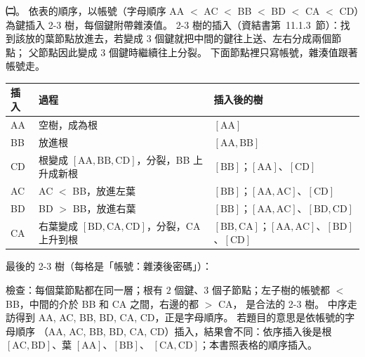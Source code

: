 \begin{pastsoln}
\textbf{㈡}。 依表的順序，以帳號（字母順序 AA $<$ AC $<$ BB $<$ BD $<$ CA $<$ CD）為鍵插入 2-3 樹，每個鍵附帶雜湊值。
2-3 樹的插入（資結書第~11.1.3~節）：找到該放的葉節點放進去，若變成 $3$ 個鍵就把中間的鍵往上送、左右分成兩個節點；
父節點因此變成 $3$ 個鍵時繼續往上分裂。 下面節點裡只寫帳號，雜湊值跟著帳號走。
\begin{center}
\small
\begin{tabular}{lll}
\toprule
插入 & 過程 & 插入後的樹 \\
\midrule
AA & 空樹，成為根 & $[\mathrm{AA}]$ \\
BB & 放進根 & $[\mathrm{AA}, \mathrm{BB}]$ \\
CD & 根變成 $[\mathrm{AA}, \mathrm{BB}, \mathrm{CD}]$，分裂，BB 上升成新根 & $[\mathrm{BB}]$；$[\mathrm{AA}]$、$[\mathrm{CD}]$ \\
AC & AC $<$ BB，放進左葉 & $[\mathrm{BB}]$；$[\mathrm{AA}, \mathrm{AC}]$、$[\mathrm{CD}]$ \\
BD & BD $>$ BB，放進右葉 & $[\mathrm{BB}]$；$[\mathrm{AA}, \mathrm{AC}]$、$[\mathrm{BD}, \mathrm{CD}]$ \\
CA & 右葉變成 $[\mathrm{BD}, \mathrm{CA}, \mathrm{CD}]$，分裂，CA 上升到根 & $[\mathrm{BB}, \mathrm{CA}]$；$[\mathrm{AA}, \mathrm{AC}]$、$[\mathrm{BD}]$、$[\mathrm{CD}]$ \\
\bottomrule
\end{tabular}
\end{center}
最後的 2-3 樹（每格是「帳號：雜湊後密碼」）：
\begin{center}
\end{center}
檢查：每個葉節點都在同一層；根有 $2$ 個鍵、$3$ 個子節點；左子樹的帳號都 $<$ BB，中間的介於 BB 和 CA 之間，右邊的都 $>$ CA，
是合法的 2-3 樹。 中序走訪得到 AA, AC, BB, BD, CA, CD，正是字母順序。 若題目的意思是依帳號的字母順序
（AA, AC, BB, BD, CA, CD）插入，結果會不同：依序插入後是根 $[\mathrm{AC}, \mathrm{BD}]$、葉 $[\mathrm{AA}]$、$[\mathrm{BB}]$、
$[\mathrm{CA}, \mathrm{CD}]$；本書照表格的順序插入。
\end{pastsoln}
